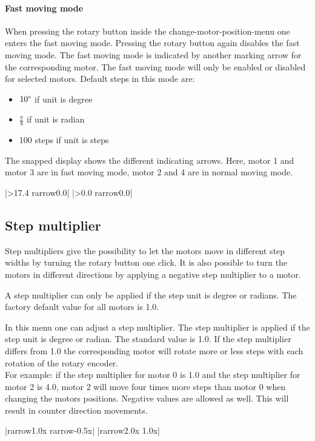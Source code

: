 \paragraph{Fast moving mode}
When pressing the rotary button inside the change-motor-position-menu one
enters the fast moving mode. Pressing the rotary button again disables the
fast moving mode. The fast moving mode is indicated by another marking arrow
for the corresponding motor. The fast moving mode will only be enabled or
disabled for selected motors.
Default steps in this mode are:
\begin{itemize}
  \item $10\degree$ if unit is degree
  \item $\frac{\pi}{8}$ if unit is radian
  \item 100 steps if unit is steps
\end{itemize}
The snapped display shows the different indicating arrows. Here, motor 1
and motor 3 are in fast moving mode, motor 2 and 4 are in normal moving mode.
\begin{center}
  |>17.4  {rarrow}0.0|
             |>0.0   {rarrow}0.0|
\end{center}


\subsection{Step multiplier}
Step multipliers give the possibility to let the motors move in different
step widths by turning the rotary button one click. It is also possible
to turn the motors in different directions by applying a negative step
multiplier to a motor.

A step multiplier can only be applied if the step unit is degree or radians.
The factory default value for all motors is 1.0.

In this menu one can adjust a step multiplier. The step multiplier is
applied if the step unit is degree or radian. The standard value is 1.0.
If the step multiplier differs from 1.0 the corresponding motor will
rotate more or less steps with each rotation of the rotary encoder.\\
For example: if the step multiplier for motor 0 is 1.0 and the step
multiplier for motor 2 is 4.0, motor 2 will move four times more steps
than motor 0 when changing the motors positions. Negative values are
allowed as well. This will result in counter direction movements.
\begin{center}
  |{rarrow}1.0x   {rarrow}-0.5x|
             |{rarrow}2.0x    1.0x|
\end{center}

